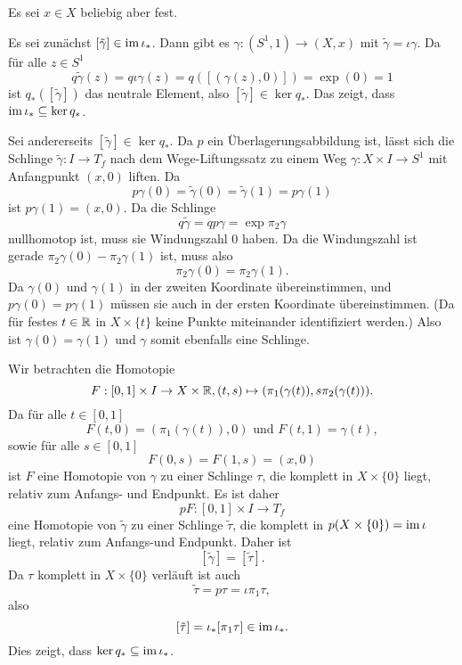 \documentclass[a4paper,10pt]{article}
\begin{document}
\subsection{}
Es sei $x \in X$ beliebig aber fest.

Es sei zunächst $[\tilde{\gamma}] \in \operatorname{im} \iota_*$. Dann gibt es $\gamma : (S^1, 1) \to (X,x)$ mit $\tilde{\gamma} = \iota \gamma$. Da für alle $z \in S^1$
\[
 q \tilde{\gamma}(z)
 = q \iota \gamma(z)
 = q ([(\gamma(z),0)])
 = \exp(0)
 = 1
\]
ist $q_*([\tilde{\gamma}])$ das neutrale Element, also $[\tilde{\gamma}] \in \ker q_*$. Das zeigt, dass $\operatorname{im} \iota_* \subseteq \ker q_*$.

Sei andererseits $[\tilde{\gamma}] \in \ker q_*$. Da $p$ ein Überlagerungsabbildung ist, lässt sich die Schlinge $\tilde{\gamma} : I \to T_f$ nach dem Wege-Liftungssatz zu einem Weg $\gamma : X \times I \to S^1$ mit Anfangpunkt $(x,0)$ liften. Da
\[
 p \gamma(0) = \tilde{\gamma}(0) = \tilde{\gamma}(1) = p \gamma (1)
\]
ist $p \gamma(1) = (x,0)$. Da die Schlinge
\[
 q \tilde{\gamma}
 = q p \gamma
 = \exp \pi_2 \gamma
\]
nullhomotop ist, muss sie Windungszahl $0$ haben. Da die Windungszahl ist gerade $\pi_2 \gamma(0) - \pi_2 \gamma(1)$ ist, muss also
\[
 \pi_2 \gamma(0) = \pi_2 \gamma(1).
\]
Da $\gamma(0)$ und $\gamma(1)$ in der zweiten Koordinate übereinstimmen, und $p \gamma(0) = p \gamma(1)$ müssen sie auch in der ersten Koordinate übereinstimmen. (Da für festes $t \in \mathbb{R}$ in $X \times \{t\}$ keine Punkte miteinander identifiziert werden.) Also ist $\gamma(0) = \gamma(1)$ und $\gamma$ somit ebenfalls eine Schlinge.

Wir betrachten die Homotopie
\[
 F : [0,1] \times I \to X \times \mathbb{R}, (t,s) \mapsto ( \pi_1(\gamma(t)), s \pi_2(\gamma(t)) ).
\]
Da für alle $t \in [0,1]$
\[
 F(t,0) = (\pi_1(\gamma(t)),0) \text{ und }
 F(t,1) = \gamma(t),
\]
sowie für alle $s \in [0,1]$
\[
 F(0,s) = F(1,s) = (x,0)
\]
ist $F$ eine Homotopie von $\gamma$ zu einer Schlinge $\tau$, die komplett in $X \times \{0\}$ liegt, relativ zum Anfangs- und Endpunkt. Es ist daher
\[
 p F : [0,1] \times I \to T_f
\]
eine Homotopie von $\tilde{\gamma}$ zu einer Schlinge $\tilde{\tau}$, die komplett in $p(X \times \{0\}) = \operatorname{im} \iota$ liegt, relativ zum Anfangs-und Endpunkt. Daher ist
\[
 [\tilde{\gamma}] = [\tilde{\tau}].
\]
Da $\tau$ komplett in $X \times \{0\}$ verläuft ist auch
\[
 \tilde{\tau} = p \tau = \iota \pi_1 \tau,
\]
also
\[
 [\tilde{\tau}] = \iota_* [\pi_1 \tau] \in \operatorname{im} \iota_*.
\]
Dies zeigt, dass $\ker q_* \subseteq \operatorname{im} \iota_*$.
\end{document}
